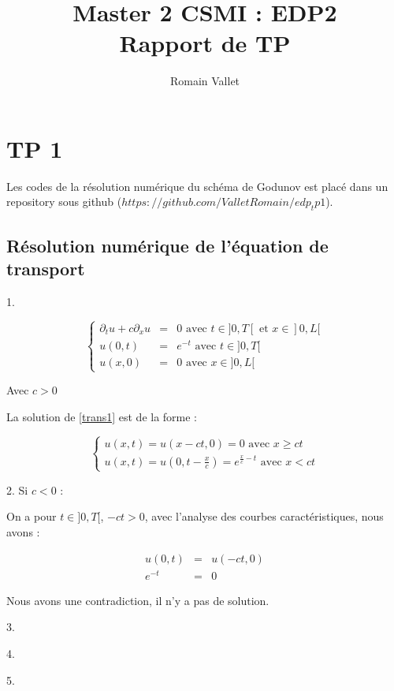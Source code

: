 \documentclass{article}
\title{Master 2 CSMI : EDP2\\Rapport de TP}
\author{Romain Vallet}
\begin{document}
\maketitle

\section{TP 1}

Les codes de la résolution numérique du schéma de Godunov est placé dans un repository sous github ($https://github.com/ValletRomain/edp_tp1$).

\subsection{Résolution numérique de l’équation de transport}

1.

\[ \left\{ \begin{matrix}
\partial_t u + c \partial_x u &=& 0 \text{ avec } t \in ]0,T[ \text{ et } x \in ]0,L[  \\
u(0,t) &=& e^{-t} \text{ avec } t \in ]0,T[ \\
u(x,0) &=& 0 \text{ avec } x \in ]0,L[
\end{matrix} \right.
\label{trans1} \tag{Transport1} \]

Avec $c>0$
\newline

La solution de \ref{trans1} est de la forme :

\[
\left\{
\begin{array}{ll}
    u(x,t) = u(x-ct,0) = 0 \text{ avec } x \geq ct \\
    u(x,t) = u(0,t-\frac{x}{c}) = e^{\frac{x}{c}-t} \text{ avec } x < ct
\end{array}
\right.
\tag{Sol1}
\]

2. Si $c < 0$ :

On a pour $t \in ]0,T[$, $-ct>0$, avec l'analyse des courbes caractéristiques, nous avons :

\begin{eqnarray*}
u(0,t) &=& u(-ct,0) \\
e^{-t} &=& 0
\end{eqnarray*}

Nous avons une contradiction, il n'y a pas de solution.
\newline

3.

4.

5.
\end{document}
